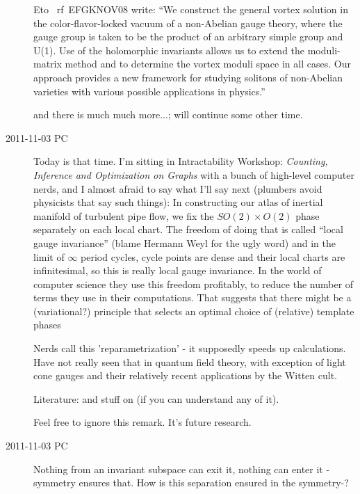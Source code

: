 \begin{description}
Eto \etal~rf~{EFGKNOV08} write:
   ``We construct the general vortex solution in the color-flavor-locked
   vacuum of a non-Abelian gauge theory, where the gauge group is taken
   to be the product of an arbitrary simple group and U(1). Use of the
   holomorphic invariants allows us to extend the moduli-matrix method
   and to determine the vortex moduli space in all cases. Our approach
   provides a new framework for studying solitons of non-Abelian
   varieties with various possible applications in physics.''

and there is much much more...; will continue some other time.

\item[2011-11-03 PC] Today is that time. I'm sitting in
     {Intractability Workshop:}
     \emph{Counting, Inference and Optimization on Graphs}
with a bunch of high-level computer nerds, and I almost afraid to say
what I'll say next (plumbers avoid physicists that say such things): In
constructing our atlas of inertial manifold of turbulent pipe flow, we
fix the $SO(2) \times O(2)$ phase separately on each local chart. The
freedom of doing that is called ``local gauge invariance'' (blame Hermann
Weyl for the ugly word) and in the limit of $\infty$ period cycles, cycle
points are dense and their local charts are infinitesimal, so this is
really local gauge invariance. In the world of computer science they use
this freedom profitably, to reduce the number of terms they use in their
computations. That suggests that there might be a (variational?)
principle that selects an optimal choice of (relative) template phases

Nerds call this 'reparametrization' - it supposedly speeds up calculations.
Have not really seen that in quantum field theory, with exception of light
cone gauges and their relatively recent applications by the Witten cult.

Literature:  and stuff on
 (if you can understand any of it).

Feel free to ignore this remark. It's future research.

\item[2011-11-03 PC] Nothing from an invariant subspace can exit it,
nothing can enter it - symmetry ensures that. How is this separation
ensured in the symmetry-\reducedsp?


\end{description}
